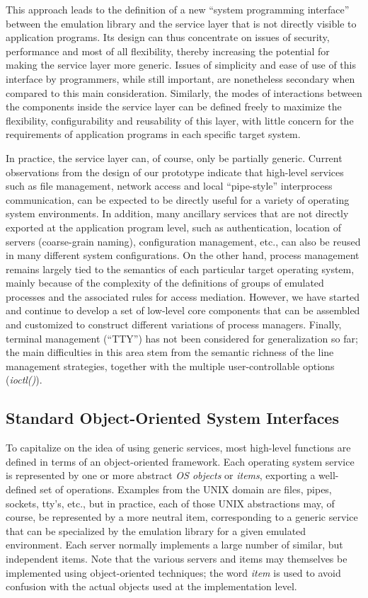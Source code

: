 This approach leads to the definition of a new ``system programming
interface'' between the emulation library and the service layer that
is not directly visible to application programs. Its design can thus
concentrate on issues of security, performance and most of all
flexibility, thereby increasing the potential for making the service
layer more generic. Issues of simplicity and ease of use of this
interface by programmers, while still important, are nonetheless
secondary when compared to this main consideration. Similarly, the
modes of interactions between the components inside the service layer
can be defined freely to maximize the flexibility, configurability and
reusability of this layer, with little concern for the requirements of
application programs in each specific target system.

In practice, the service layer can, of course, only be partially
generic.  Current observations from the design of our prototype
indicate that high-level services such as file management, network
access and local ``pipe-style'' interprocess communication, can be
expected to be directly useful for a variety of operating system
environments.  In addition, many ancillary services that are not
directly exported at the application program level, such as
authentication, location of servers (coarse-grain naming),
configuration management, etc., can also be reused in many different
system configurations.  On the other hand, process management remains
largely tied to the semantics of each particular target operating
system, mainly because of the complexity of the definitions of groups
of emulated processes and the associated rules for access mediation.
However, we have started and continue to develop a set of low-level
core components that can be assembled and customized to construct
different variations of process managers.  Finally, terminal
management (``TTY'') has not been considered for generalization so
far; the main difficulties in this area stem from the semantic
richness of the line management strategies, together with the multiple
user-controllable options ({\em ioctl()}).



\subsection{Standard Object-Oriented System Interfaces}

To capitalize on the idea of using generic services, most high-level
functions are defined in terms of an object-oriented framework.  Each
operating system service is represented by one or more abstract {\em
OS objects} or {\em items}, exporting a well-defined set of
operations.  Examples from the UNIX domain are files, pipes, sockets,
tty's, etc., but in practice, each of those UNIX abstractions may, of
course, be represented by a more neutral item, corresponding to a
generic service that can be specialized by the emulation library for a
given emulated environment.  Each server normally implements a large
number of similar, but independent items.  Note that the various
servers and items may themselves be implemented using object-oriented
techniques; the word {\em item} is used to avoid confusion with the
actual objects used at the implementation level.

